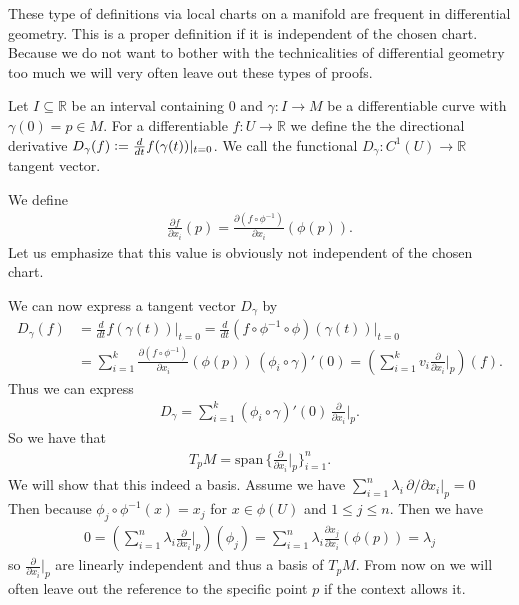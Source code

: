 \documentclass[12pt,a4paper]{article}
\numberwithin{equation}{subsection}
\numberwithin{lemma}{subsection}
\theoremstyle{definition}
\newcommand{\real}{\mathbb{R}}
\begin{document}
These type of definitions via local charts on a manifold are frequent in
differential geometry. This is a proper definition if it is independent of the 
chosen chart. Because we do not want to bother with the technicalities of 
differential geometry too much we will very often leave out these types of
proofs.  

Let $I \subseteq \real$ be an interval containing $0$ and 
$\gamma: I \rightarrow M$ be a differentiable curve with $\gamma(0) = p \in M$.
For a differentiable $f: U \rightarrow \real$ 
we define the the directional derivative 
$D_\gamma(f) \vcentcolon= \frac{d}{dt} f(\gamma(t)) |_{t=0}$.
We call the functional $D_\gamma: C^1(U) \rightarrow \real$ 
tangent vector. 

We define 
\begin{align}
    \frac{\partial f}{\partial x_i} (p) 
    = \frac{\partial (f \circ \phi^{-1})}{\partial x_i}(\phi(p)).
    \label{eq:derivative_on_manifold}
\end{align}
Let us emphasize that this value is obviously not independent of the chosen 
chart.

We can now 
express a tangent vector $D_\gamma$ by 
\begin{align}
    D_\gamma(f) &=  \frac{d}{dt} f(\gamma(t)) \big|_{t=0}
    =  \frac{d}{dt} (f \circ \phi^{-1} \circ \phi)  (\gamma(t)) \big|_{t=0}
    \\ &= \sum\limits_{i=1}^k \frac{\partial (f \circ \phi^{-1})}{\partial x_i} 
        (\phi(p))
        \, (\phi_i\circ \gamma)'(0)
    = (\sum\limits_{i=1}^k v_i  \frac{\partial}{\partial x_i}\Big|_p )(f).
\end{align}
Thus we can express 
\begin{align*}
    D_\gamma = \sum\limits_{i=1}^k 
    (\phi_i \circ \gamma)' (0) \, \frac{\partial}{\partial x_i}\bigg|_p.
\end{align*}
So we have that 
\begin{align*}
    T_p M = \text{span}\, 
        \bigg\{ \frac{\partial}{\partial x_i}\bigg|_p \bigg\}_{i=1}^n.
\end{align*}
We will show that this indeed a basis. 
Assume we have $\sum_{i=1}^n \lambda_i \, \partial/\partial x_i|_p = 0$
Then because $\phi_j \circ \phi^{-1} (x) = x_j$ for $x \in \phi(U)$ and 
$1 \leq j \leq n$. Then we have 
\begin{align*}
    0 = \left( \sum\limits_{i=1}^n \lambda_i \frac{\partial}{\partial x_i}|_p
        \right) (\phi_j)
    = \sum\limits_{i=1}^n \lambda_i \frac{\partial x_j}{\partial x_i}(\phi(p))
    = \lambda_j
\end{align*}
so $\frac{\partial}{\partial x_i}|_p $ are
linearly independent and thus a basis of $T_p M$. From now on we will often 
leave out the reference to the specific point $p$ if the context allows it.
\end{document}
